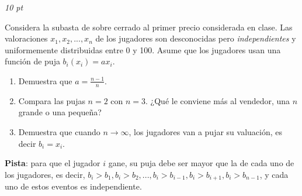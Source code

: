\documentclass[12pt]{scrartcl} %
\begin{document}
\begin{Exercise}[title={Subasta de sobre cerrado con $n$ jugadores},name={Pregunta}]
  \textit{10 pt}

  Considera la subasta de sobre cerrado al primer precio considerada en clase. Las valoraciones $x_1, x_2,...,x_n$ de los jugadores son desconocidas pero \textit{independientes} y uniformemente distribuidas entre 0 y 100. Asume que los jugadores usan una función de puja $b_i(x_i)=ax_i$.

  \begin{enumerate}
    \item Demuestra que $a=\frac{n-1}{n}$.
    \item Compara las pujas $n=2$ con $n=3$. ¿Qué le conviene más al vendedor, una $n$ grande o una pequeña?
    \item Demuestra que cuando $n \rightarrow \infty$, los jugadores van a pujar su valuación, es decir $b_i = x_i$.
  \end{enumerate}

  \textbf{Pista}: para que el jugador $ i $ gane, su puja debe ser mayor que la de cada uno de los jugadores, es decir, $ b_i > b_1, b_i > b_2, ..., b_i > b_{i-1}, b_i > b_{i+1}, b_i > b_{n-1} $, y cada uno de estos eventos es independiente. %



\end{Exercise}

\end{document}
